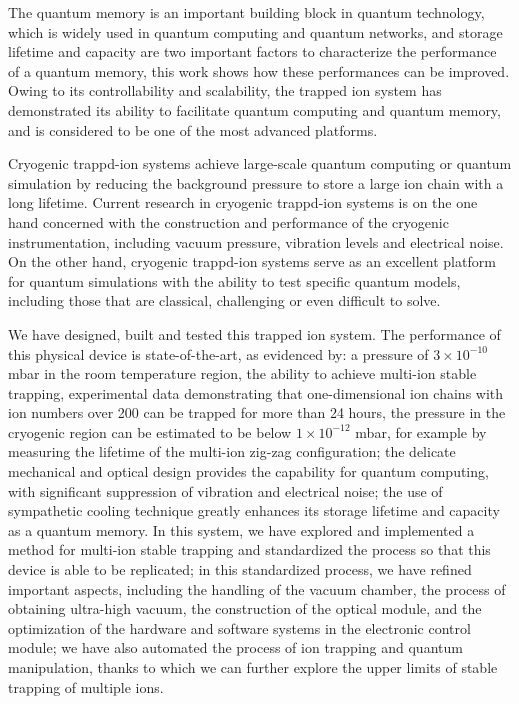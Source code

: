 \begin{abstract*}

  The quantum memory is an important building block in quantum technology, which is widely used in quantum computing and quantum networks, and storage lifetime and capacity are two important factors to characterize the performance of a quantum memory, this work shows how these performances can be improved. Owing to its controllability and scalability, the trapped ion system has demonstrated its ability to facilitate quantum computing and quantum memory, and is considered to be one of the most advanced platforms.

  Cryogenic trappd-ion systems achieve large-scale quantum computing or quantum simulation by reducing the background pressure to store a large ion chain with a long lifetime. Current research in cryogenic trappd-ion systems is on the one hand concerned with the construction and performance of the cryogenic instrumentation, including vacuum pressure, vibration levels and electrical noise. On the other hand, cryogenic trappd-ion systems serve as an excellent platform for quantum simulations with the ability to test specific quantum models, including those that are classical, challenging or even difficult to solve.

  We have designed, built and tested this trapped ion system. The performance of this physical device is state-of-the-art, as evidenced by: a pressure of $3 \times {10}^{-10}$ mbar in the room temperature region, the ability to achieve multi-ion stable trapping, experimental data demonstrating that one-dimensional ion chains with ion numbers over 200 can be trapped for more than 24 hours, the pressure in the cryogenic region can be estimated to be below $1 \times {10}^{-12}$ mbar, for example by measuring the lifetime of the multi-ion zig-zag configuration; the delicate mechanical and optical design provides the capability for quantum computing, with significant suppression of vibration and electrical noise; the use of sympathetic cooling technique greatly enhances its storage lifetime and capacity as a quantum memory. In this system, we have explored and implemented a method for multi-ion stable trapping and standardized the process so that this device is able to be replicated; in this standardized process, we have refined important aspects, including the handling of the vacuum chamber, the process of obtaining ultra-high vacuum, the construction of the optical module, and the optimization of the hardware and software systems in the electronic control module; we have also automated the process of ion trapping and quantum manipulation, thanks to which we can further explore the upper limits of stable trapping of multiple ions.


\end{abstract*}
